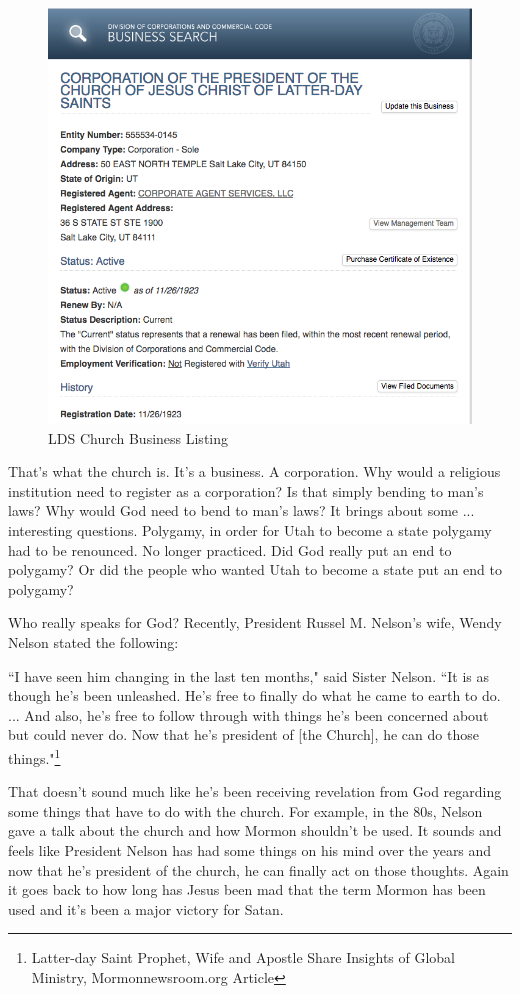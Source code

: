 \begin{figure}[h!]
  \centering
  \includegraphics[width=1\linewidth]{articles/images/business.png}
  \caption{LDS Church Business Listing}
  \label{fig:business}
\end{figure}

That's what the church is. It's a business. A corporation. Why would a religious
institution need to register as a corporation? Is that simply bending to man's laws?
Why would God need to bend to man's laws? It brings about some ... interesting
questions. Polygamy, in order for Utah to become a state polygamy had to be
renounced. No longer practiced. Did God really put an end to polygamy? Or did the
people who wanted Utah to become a state put an end to polygamy?

Who really speaks for God? Recently, President Russel M. Nelson's wife, Wendy Nelson
stated the following:

\begin{displayquote}
``I have seen him changing in the last ten months," said Sister Nelson. ``It is as 
though he's been unleashed. He's free to finally do what he came to earth to do. ... 
And also, he's free to follow through with things he's been concerned about but 
could never do. Now that he's president of [the Church], he can do those
things."\footnote{Latter-day Saint Prophet, Wife and Apostle Share Insights 
of Global Ministry, Mormonnewsroom.org Article}
\end{displayquote}

That doesn't sound much like he's been receiving revelation from God regarding some
things that have to do with the church. For example, in the 80s, Nelson gave a talk
about the church and how Mormon shouldn't be used. It sounds and feels like President
Nelson has had some things on his mind over the years and now that he's president of
the church, he can finally act on those thoughts. Again it goes back to how long has
Jesus been mad that the term Mormon has been used and it's been a major victory for
Satan.